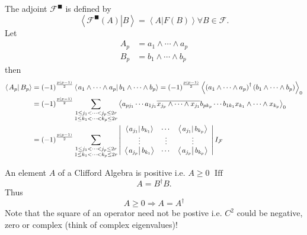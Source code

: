 \documentclass[aps,preprint]{revtex4}%
\begin{document}
The adjoint $\mathcal{F}^{\blacksquare}$ is defined by%
\begin{equation}
\left\langle \left.  \mathcal{F}^{\blacksquare}\left(  A\right)  \right\vert
B\right\rangle =\left\langle \left.  A\right\vert F\left(  B\right)
\right\rangle \forall B\in\mathcal{F}.
\end{equation}
Let
\begin{align}
A_{p}  &  =a_{1}\wedge\cdots\wedge a_{p}\\
B_{p}  &  =b_{1}\wedge\cdots\wedge b_{p}%
\end{align}
then
\begin{align}
\left\langle \left.  A_{p}\right\vert B_{p}\right\rangle  &  =\left(
-1\right)  ^{\frac{p\left(  p-1\right)  }{2}}\left\langle \left.  a_{1}%
\wedge\cdots\wedge a_{p}\right\vert b_{1}\wedge\cdots\wedge b_{p}\right\rangle
=\left(  -1\right)  ^{\frac{p\left(  p-1\right)  }{2}}\left\langle \left(
a_{1}\wedge\cdots\wedge a_{p}\right)  ^{\dagger}\left(  b_{1}\wedge
\cdots\wedge b_{p}\right)  \right\rangle _{0}\\
&  =\left(  -1\right)  ^{\frac{p\left(  p-1\right)  }{2}}\sum_{\substack{1\leq
j_{1}<\cdots<j_{p}\leq2r\\1\leq k_{1}<\cdots<k_{p}\leq2r}}\left\langle
a_{pj_{1}}\cdots a_{1j_{1}}\overline{x_{j_{p}}\wedge\cdots\wedge x_{j_{1}}%
}b_{pk_{p}}\cdots b_{1k_{1}}x_{k_{1}}\wedge\cdots\wedge x_{k_{p}}\right\rangle
_{0}\\
&  =\left(  -1\right)  ^{\frac{p\left(  p-1\right)  }{2}}\sum_{\substack{1\leq
j_{1}<\cdots<j_{p}\leq2r\\1\leq k_{1}<\cdots<k_{p}\leq2r}}\left\vert
\begin{array}
[c]{ccc}%
\left\langle \left.  a_{j_{1}}\right\vert b_{k_{1}}\right\rangle  & \cdots &
\left\langle \left.  a_{j_{1}}\right\vert b_{k_{p}}\right\rangle \\
\vdots & \vdots & \vdots\\
\left\langle \left.  a_{j_{p}}\right\vert b_{k_{1}}\right\rangle  & \cdots &
\left\langle \left.  a_{j_{p}}\right\vert b_{k_{p}}\right\rangle
\end{array}
\right\vert I_{\mathcal{F}}%
\end{align}


An element $A$ of a Clifford Algebra is positive i.e. $A\geq0$
$\operatorname*{Iff}$
\begin{equation}
A=B^{\dagger}B.
\end{equation}
Thus
\begin{equation}
A\geq0\Rightarrow A=A^{\dagger}%
\end{equation}
Note that the square of an operator need not be postive i.e. $C^{2}$ could be
negative, zero or complex (think of complex eigenvalues)!
\end{document}
